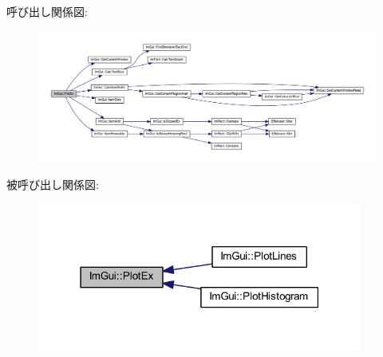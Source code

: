 呼び出し関係図\+:\nopagebreak
\begin{figure}[H]
\begin{center}
\leavevmode
\includegraphics[width=350pt]{namespace_im_gui_a0a18ae07b294d5667f95a5c003d2efb6_cgraph}
\end{center}
\end{figure}
被呼び出し関係図\+:\nopagebreak
\begin{figure}[H]
\begin{center}
\leavevmode
\includegraphics[width=303pt]{namespace_im_gui_a0a18ae07b294d5667f95a5c003d2efb6_icgraph}
\end{center}
\end{figure}
\mbox{\label{namespace_im_gui_af7a92b2118981835b5251bfdaac50252}} 
